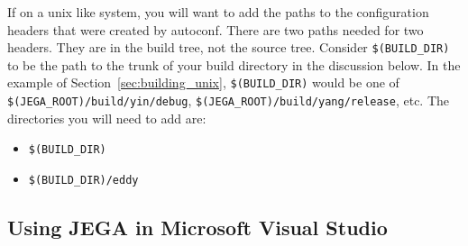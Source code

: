 If on a unix like system, you will want to add the paths to the
configuration headers that were created by autoconf. There are two
paths needed for two headers. They are in the build tree, not the
source tree. Consider \texttt{\$(BUILD\_DIR)} to be the path to the
trunk of your build directory in the discussion below. In the
example of Section~\ref{sec:building_unix}, \texttt{\$(BUILD\_DIR)}
would be one of \texttt{\$(JEGA\_ROOT)/build/yin/debug},
\texttt{\$(JEGA\_ROOT)/build/yang/release}, etc.  The directories
you will need to add are:

\begin{itemize}
\item \texttt{\$(BUILD\_DIR)}
\item \texttt{\$(BUILD\_DIR)/eddy}
\end{itemize}

\subsection{Using JEGA in Microsoft Visual Studio}\label{sec:building_msvs}
